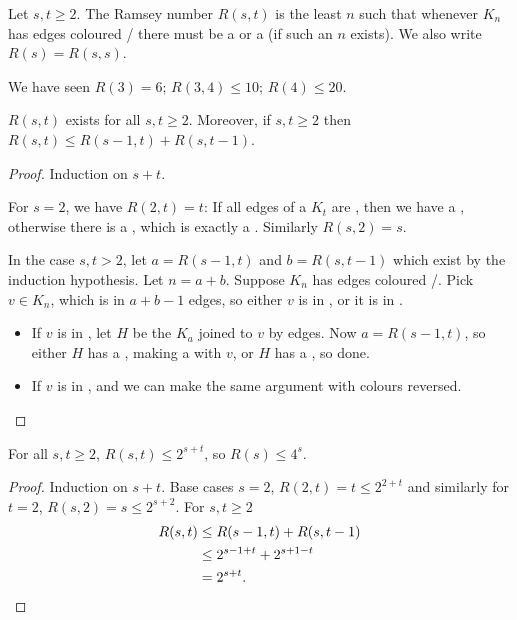 \documentclass{article}
\begin{document}
\begin{defi}
    Let $s, t \geq 2$. The Ramsey number $R(s, t)$ is the least $n$ such that whenever $K_n$ has edges coloured / there must be a  or a  (if such an $n$ exists).
    We also write $R(s) = R(s, s)$.
\end{defi}

We have seen $R(3) = 6$; $R(3, 4) \leq 10$; $R(4) \leq 20$.

\begin{nthm}\label{thm:ramsey}
    $R(s, t)$ exists for all $s, t \geq 2$.  Moreover, if $s, t \geq 2$ then $R(s, t) \leq R(s-1, t) + R(s, t-1)$.
\end{nthm}

\begin{proof}
    Induction on $s+t$.

    For $s=2$, we have $R(2, t) = t$: If all edges of a $K_t$ are , then we have a , otherwise there is a , which is exactly a .  Similarly $R(s, 2) = s$.

    In the case $s, t > 2$, let $a = R(s-1, t)$ and $b = R(s, t-1)$ which exist by the induction hypothesis.  Let $n = a+b$. Suppose $K_n$ has edges coloured /.
    Pick $v \in K_n$, which is in $a+b-1$ edges, so either $v$ is in , or it is in .
    \begin{itemize}
        \item If $v$ is in , let $H$ be the $K_a$ joined to $v$ by  edges.  Now $a = R(s-1, t)$, so either $H$ has a , making a  with $v$, or $H$ has a , so done.
        \item If $v$ is in , and we can make the same argument with colours reversed.
    \end{itemize}
\end{proof}

\begin{ncor}
    For all $s, t \geq 2$, $R(s, t) \leq 2^{s+t}$, so $R(s) \leq 4^s$.
\end{ncor}

\begin{proof}
    Induction on $s + t$.  Base cases $s=2$, $R(2, t) = t \leq 2^{2+t}$ and similarly for $t=2$, $R(s, 2) = s \leq 2^{s+2}$.
    For $s, t \geq 2$
    \begin{align*}
        R(s, t) &\leq R(s-1, t) + R(s, t-1) \\
                &\leq 2^{s-1+t} + 2^{s+1-t} \\
                &= 2^{s+t}. \qedhere
    \end{align*}
\end{proof}
\end{document}
